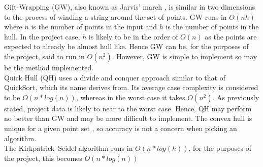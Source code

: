 Gift-Wrapping (GW), also known as Jarvis' march \cite{Jarvis1973}, is similar in two dimensions to the process of winding a string around the set of points. 
GW runs in $O(nh)$  \cite{Cormen2001} where $n$ is the number of points in the input and $h$ is the number of points in the hull. In the project case, $h$ is likely to be in the order of $O(n)$ as the points are expected to already be almost hull like. 
Hence GW can be, for the purposes of the project, said to run in $O(n^2)$. However, GW is simple to implement so may be the method implemented.\\

Quick Hull (QH) uses a divide and conquer approach similar to that of QuickSort, which its name derives from. 
Its average case complexity is considered to be $O(n * log(n))$, whereas in the worst case it takes $O(n^2)$.
As previously stated, project data is likely to near to the worst case.
Hence, QH may perform no better than GW and may be more difficult to implement.
The convex hull is unique for a given point set \cite{Sedgewick2012}, so accuracy is not a concern when picking an algorithm.\\

The Kirkpatrick–Seidel algorithm runs in $O(n*log(h))$, for the purposes of the project, this becomes $O(n*log(n))$


